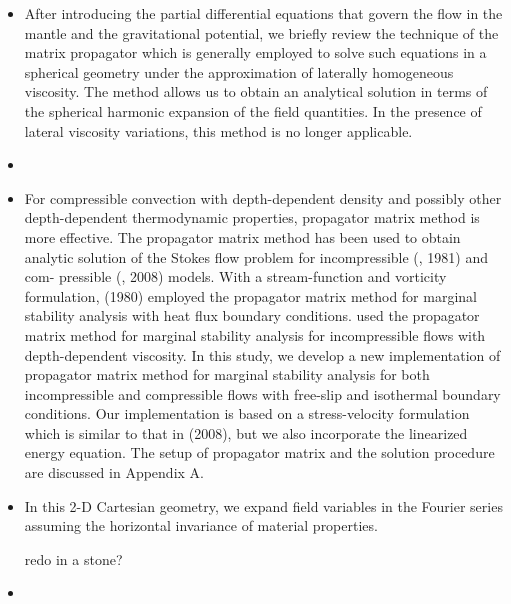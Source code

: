 \begin{itemize}
\item {}

\begin{displayquote}
{\color{darkgray}
After introducing the partial differential equations that govern the flow in the
mantle and the gravitational potential, we briefly review the technique of the
matrix propagator which is generally employed to solve such equations in a
spherical geometry under the approximation of laterally homogeneous viscosity.
The method allows us to obtain an analytical solution in terms of the spherical
harmonic expansion of the field quantities. In the presence of lateral viscosity
variations, this method is no longer applicable.
}
\end{displayquote}


\item {}

\item {}

\begin{displayquote}
{\color{darkgray}
For compressible convection with depth-dependent density and
possibly other depth-dependent thermodynamic properties, propagator 
matrix method is more effective. The propagator matrix
method has been used to obtain analytic solution of the Stokes flow
problem for incompressible (\textcite{haoc81}, 1981) and com-
pressible (\textcite{lezh08}, 2008) models. With a stream-function
and vorticity formulation, \textcite{jamc80} (1980) employed the
propagator matrix method for marginal stability analysis with heat
flux boundary conditions. \textcite{bugo94} used the propagator
matrix method for marginal stability analysis for incompressible
flows with depth-dependent viscosity. In this study, we develop a
new implementation of propagator matrix method for marginal stability 
analysis for both incompressible and compressible flows with
free-slip and isothermal boundary conditions. Our implementation
is based on a stress-velocity formulation which is similar to that
in \textcite{lezh08} (2008), but we also incorporate the linearized
energy equation. The setup of propagator matrix and the solution
procedure are discussed in Appendix A.
}
\end{displayquote}



\item {}

\begin{displayquote}
{\color{darkgray}
In this 2-D Cartesian geometry, we expand field variables in the Fourier series assuming the horizontal invariance of material properties.
}
\end{displayquote}

{\color{red} redo in a stone?}



\item {}

\end{itemize}

